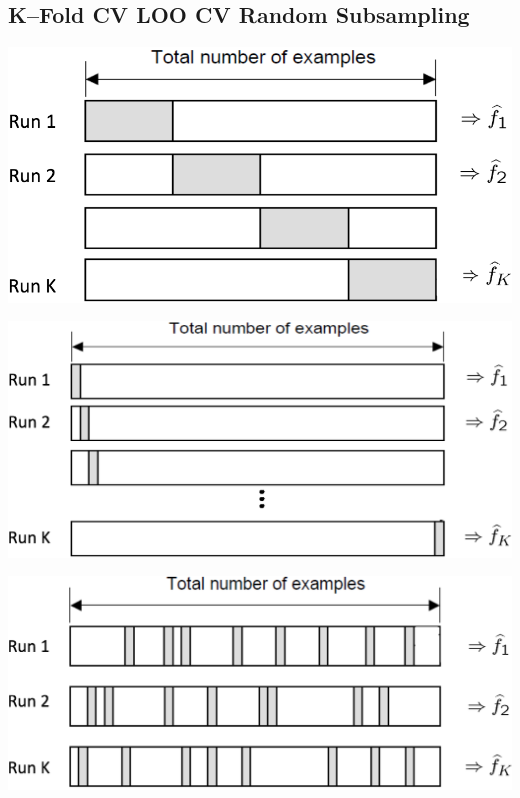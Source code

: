 \documentclass[18pt,a3paper,landscape, ncols=3]{cheatsheet}
\begin{document}
		\subsection{K--Fold CV \qquad\qquad\qquad\quad LOO CV \qquad\qquad\qquad Random Subsampling}
			\begin{mdframed}
				\begin{minipage}{0.3\linewidth}
					\includegraphics[width=\linewidth]{K_fold_cross_validation.png}
				\end{minipage}%
				\hfill%
				\begin{minipage}{0.3\linewidth}
					\includegraphics[width=\linewidth]{LOO_cross_validation.png}
				\end{minipage}%
				\hfill%
				\begin{minipage}{0.3\linewidth}
					\includegraphics[width=\linewidth]{random_subsampling.png}
				\end{minipage}
			\end{mdframed}
\end{document}
